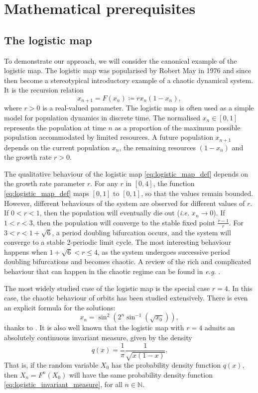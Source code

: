 \documentclass[a4paper]{article}
\theoremstyle{definition}
\numberwithin{equation}{section}
\numberwithin{theorem}{section}
\begin{document}
{\section{Mathematical prerequisites}

\subsection{The logistic map}

To demonstrate our approach, we will consider the canonical example of the logistic map. The logistic map was popularised by Robert May in 1976 \cite{may1976simple} and since then become a stereotypical introductory example of a chaotic dynamical system. It is the recursion relation
\begin{equation} \label{eq:logistic_map_def}
    x_{n+1} = F(x_n) \coloneqq rx_n(1-x_n),
\end{equation}
where $r>0$ is a real-valued parameter. The logistic map is often used as a simple model for population dynamics in discrete time. The normalised $x_n\in[0,1]$ represents the population at time $n$ as a proportion of the maximum possible population accommodated by limited resources. A future population $x_{n+1}$ depends on the current population $x_n$, the remaining resources $(1-x_n)$ and the growth rate $r>0$.

The qualitative behaviour of the logistic map \eqref{eq:logistic_map_def} depends on the growth rate parameter $r$. For any $r$ in $[0,4]$, the function \eqref{eq:logistic_map_def} maps $[0,1]$ to $[0,1]$, so that the values remain bounded. However, different behaviours of the system are observed for different values of $r$.  If $0<r<1$, then the population will eventually die out (\emph{i.e.} $x_n\to0$). If $1<r<3$, then the population will converge to the stable fixed point $\frac{r-1}{r}$. For $3<r<1+\sqrt{6}$, a period doubling bifurcation occurs, and the system will converge to a stable 2-periodic limit cycle. The most interesting behaviour happens when $1+\sqrt{6}<r\leq 4$, as the system undergoes successive period doubling bifurcations and becomes chaotic. A review of the rich and complicated behaviour that can happen in the chaotic regime can be found in \emph{e.g.} \cite{lyubich2000quadratic}.

The most widely studied case of the logistic map is the special case $r=4$. In this case, the chaotic behaviour of orbits has been studied extensively. There is even an explicit formula for the solutions:
\begin{equation} \label{eq:explicit_formula_sine}
    x_n=\sin^2(2^n\sin^{-1}(\sqrt{x_0})),
\end{equation}
thanks to \cite{lorenz1964problem}. It is also well known that the logistic map with $r=4$ admits an absolutely continuous invariant measure, given by the density
\begin{equation} \label{eq:logistic_invariant_measure}
    q(x) = \frac{1}{\pi}\frac{1}{\sqrt{x(1-x)}}.
\end{equation}
That is, if the random variable $X_0$ has the probability density function $q(x)$, then $X_n = F^n(X_0)$ will have the same probability density function \eqref{eq:logistic_invariant_measure}, for all $n\in\mathbb{N}$.

}
\end{document}
